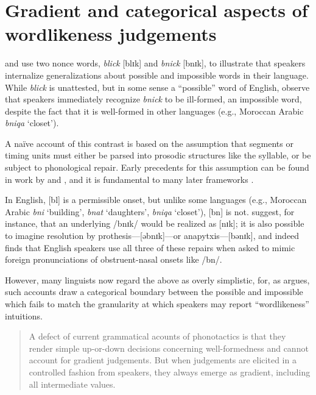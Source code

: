 \chapter{Gradient and categorical aspects of wordlikeness judgements} \label{gradience}

\citet{Halle1962} and \citet{Chomsky1965} use two nonce words, \emph{blick} [blɪk] and \emph{bnick} [bnɪk], to illustrate that speakers internalize generalizations about possible and impossible words in their language. While \emph{blick} is unattested, but in some sense a ``possible'' word of English, \citeauthor{Chomsky1965} observe that speakers immediately recognize \emph{bnick} to be ill-formed, an impossible word, despite the fact that it is well-formed in other languages (e.g., Moroccan Arabic \emph{bniqa} `closet'). 

A naïve account of this contrast is based on the assumption that segments or timing units must either be parsed into prosodic structures like the syllable, or be subject to phonological repair. Early precedents for this assumption can be found in work by \citet[10f.]{Hooper1973} and \citet[57f.]{Kahn1976}, and it is fundamental to many later frameworks \citep[e.g.,][]{Ito1989a,Noske1992,OT}.

In English, [bl] is a permissible onset, but unlike some languages (e.g., Moroccan Arabic \emph{bni} `building', \emph{bnat} `daughters', \emph{bniqa} `closet'), [bn] is not. \citet[][19f.]{Wolf2009} suggest, for instance, that an underlying /bnɪk/ would be realized as [nɪk]; it is also possible to imagine resolution by prothesis---[əbnɪk]---or anapytxis---[bənɪk], and indeed \citet{Davidson2006b} finds that English speakers use all three of these repairs when asked to mimic foreign pronunciations of obstruent-nasal onsets like /bn/.

However, many linguists now regard the above as overly simplistic, for, as \citeauthor{Shademan2006} argues, such accounts draw a categorical boundary between the possible and impossible which fails to match the granularity at which speakers may report ``wordlikeness'' intuitions.

\begin{quote}
A defect of current grammatical acounts of phonotactics is that they render simple up-or-down decisions concerning well-formedness and cannot account for gradient judgements. But when judgements are elicited in a controlled fashion from speakers, they always emerge as gradient, including all intermediate values. \citep[371]{Shademan2006} 
\end{quote}

